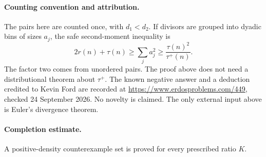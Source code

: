\paragraph{Counting convention and attribution.}
The pairs here are counted once, with \(d_1<d_2\).
If divisors are grouped into dyadic bins of sizes \(a_j\), the safe
second-moment inequality is
\[
 2r(n)+\tau(n)\geq\sum_j a_j^2
 \geq\frac{\tau(n)^2}{\tau^+(n)}.
\]
The factor two comes from unordered pairs. The proof above does not
need a distributional theorem about \(\tau^+\).
The known negative answer and a deduction credited to Kevin Ford are
recorded at \url{https://www.erdosproblems.com/449},
checked 24 September 2026. No novelty is claimed.
The only external input above is Euler's divergence theorem.

\paragraph{Completion estimate.}
A positive-density counterexample set is proved for every prescribed ratio \(K\).
